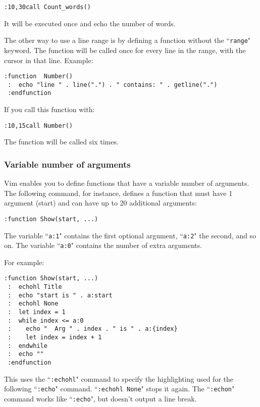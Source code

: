 \begin{Verbatim}[samepage=true]
 :10,30call Count_words()
\end{Verbatim}

It will be executed once and echo the number of words.

The other way to use a line range is by defining a function without the ``\texttt{range}" keyword.
The function will be called once for every line in the range, with the cursor in that line.
Example:

\begin{Verbatim}[samepage=true]
 :function  Number()
 :  echo "line " . line(".") . " contains: " . getline(".")
 :endfunction
\end{Verbatim}

If you call this function with:

\begin{Verbatim}[samepage=true]
 :10,15call Number()
\end{Verbatim}

The function will be called six times.
\subsubsection{Variable number of arguments}
Vim enables you to define functions that have a variable number of arguments.
The following command, for instance, defines a function that must have 1 argument (start) and can have up to 20 additional arguments:

\begin{Verbatim}[samepage=true]
 :function Show(start, ...)
\end{Verbatim}

The variable ``\texttt{a:1}" contains the first optional argument, ``\texttt{a:2}" the second, and so on.
The variable ``\texttt{a:0}" contains the number of extra arguments.

For example:

\begin{Verbatim}[samepage=true]
 :function Show(start, ...)
 :  echohl Title
 :  echo "start is " . a:start
 :  echohl None
 :  let index = 1
 :  while index <= a:0
 :    echo "  Arg " . index . " is " . a:{index}
 :    let index = index + 1
 :  endwhile
 :  echo ""
 :endfunction
\end{Verbatim}

This uses the ``\texttt{:echohl}" command to specify the highlighting used for the following ``\texttt{:echo}" command.
``\texttt{:echohl None}" stops it again.
The ``\texttt{:echon}" command works like ``\texttt{:echo}", but doesn't output a line break.

